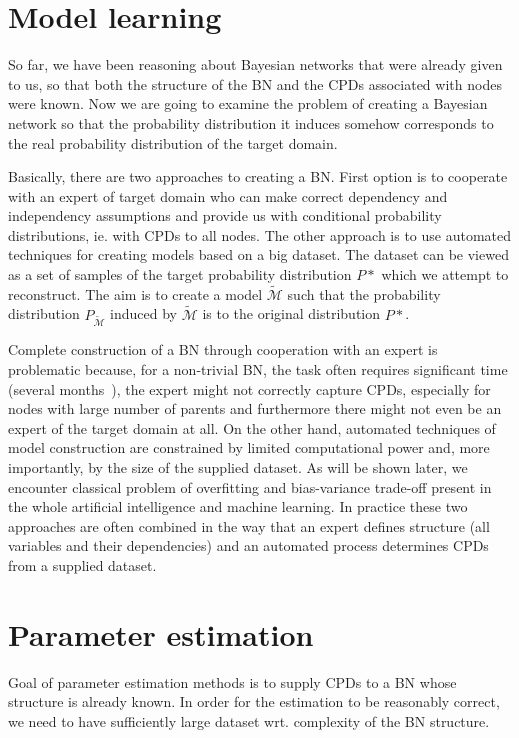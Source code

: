 \documentclass[english,cover]{fitthesis} %
\newcommand{\todo}[1]{{\color{red}#1}}
\begin{document}
\section{Model learning}
So far, we have been reasoning about Bayesian networks that were already given to us, so that both the structure of the BN and the CPDs associated with nodes were known. Now we are going to examine the problem of creating a Bayesian network so that the probability distribution it induces somehow corresponds to the real probability distribution of the target domain.

Basically, there are two approaches to creating a BN. First option is to cooperate with an expert of target domain who can make correct dependency and independency assumptions and provide us with conditional probability distributions, ie. with CPDs to all nodes. The other approach is to use automated techniques for creating models based on a big dataset. The dataset can be viewed as a set of samples of the target probability distribution $P*$ which we attempt to reconstruct. The aim is to create a model $\tilde{\mathcal{M}}$ such that the probability distribution $P_{\tilde{\mathcal{M}}}$ induced by $\tilde{\mathcal{M}}$ is  to the original distribution $P*$.

Complete construction of a BN through cooperation with an expert is problematic because, for a non-trivial BN, the task often requires significant time (several months~\cite{pgm}), the expert might not correctly capture CPDs, especially for nodes with large number of parents and furthermore there might not even be an expert of the target domain at all. On the other hand, automated techniques of model construction are constrained by limited computational power and, more importantly, by the size of the supplied dataset. As will be shown later, we encounter classical problem of overfitting and bias-variance trade-off present in the whole artificial intelligence and machine learning. In practice these two approaches are often combined in the way that an expert defines structure (all variables and their dependencies) and an automated process determines CPDs from a supplied dataset.


\section{Parameter estimation}
Goal of parameter estimation methods is to supply CPDs to a BN whose structure is already known. In order for the estimation to be reasonably correct, we need to have sufficiently large dataset wrt. complexity of the BN structure.
\end{document}
